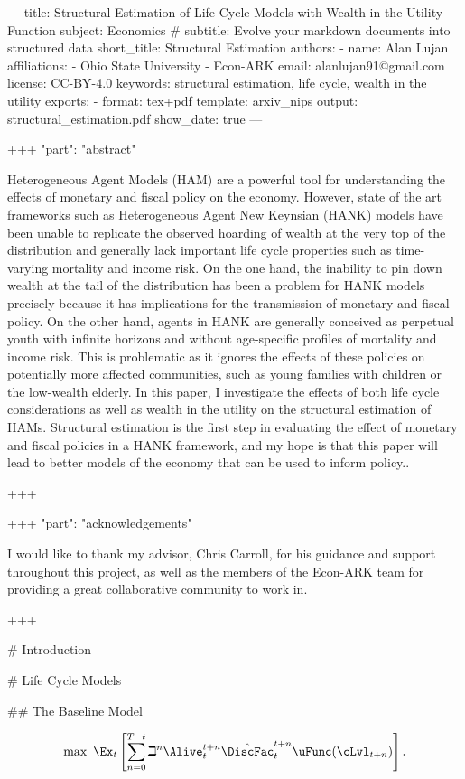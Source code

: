 ---
title: Structural Estimation of Life Cycle Models with Wealth in the Utility Function
subject: Economics
# subtitle: Evolve your markdown documents into structured data
short_title: Structural Estimation
authors:
- name: Alan Lujan
affiliations:
- Ohio State University
- Econ-ARK
email: alanlujan91@gmail.com
license: CC-BY-4.0
keywords: structural estimation, life cycle, wealth in the utility
exports:
- format: tex+pdf
template: arxiv_nips
output: structural_estimation.pdf
show_date: true
---

+++ {"part": "abstract"}

Heterogeneous Agent Models (HAM) are a powerful tool for understanding the effects of monetary and fiscal policy on the economy. However, state of the art frameworks such as Heterogeneous Agent New Keynsian (HANK) models have been unable to replicate the observed hoarding of wealth at the very top of the distribution and generally lack important life cycle properties such as time-varying mortality and income risk. On the one hand, the inability to pin down wealth at the tail of the distribution has been a problem for HANK models precisely because it has implications for the transmission of monetary and fiscal policy. On the other hand, agents in HANK are generally conceived as perpetual youth with infinite horizons and without age-specific profiles of mortality and income risk. This is problematic as it ignores the effects of these policies on potentially more affected communities, such as young families with children or the low-wealth elderly. In this paper, I investigate the effects of both life cycle considerations as well as wealth in the utility on the structural estimation of HAMs. Structural estimation is the first step in evaluating the effect of monetary and fiscal policies in a HANK framework, and my hope is that this paper will lead to better models of the economy that can be used to inform policy..

+++

+++ {"part": "acknowledgements"}

I would like to thank my advisor, Chris Carroll, for his guidance and support throughout this project, as well as the members of the Econ-ARK team for providing a great collaborative community to work in.

+++

# Introduction

# Life Cycle Models

## The Baseline Model

\begin{equation}\label{eq:MaxProb}
    \max ~ \Ex_{t}\left[ \sum_{n=0}^{T-t} {\beth}^{n} \Alive_{t}^{t+n}\hat{\DiscFac}_{t}^{t+n} \uFunc({\cLvl}_{t+n})\right].
\end{equation}

